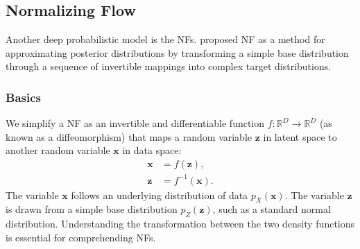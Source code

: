 \subsection{Normalizing Flow}
Another deep probabilistic model is the \acfp{NF}. \citeauthor{rezende2016} \citeyearpar{rezende2016} proposed \ac{NF} as a method for approximating posterior distributions by transforming a simple base distribution through a sequence of invertible mappings into complex target distributions. 

\subsubsection{Basics}
We simplify a \ac{NF} as an invertible and differentiable function $f:\mathbb{R}^D\rightarrow\mathbb{R}^D$ (as known as a diffeomorphism) that maps a random variable $\boldsymbol{z}$ in latent space to another random variable $\boldsymbol{x}$ in data space:
\begin{subequations}
    \begin{align}
        \label{eq:xfz}
        \boldsymbol{x} &= f(\boldsymbol{z}),\\
        \label{eq:zfx}
        \boldsymbol{z} &= f^{-1}(\boldsymbol{x}).
    \end{align}
\end{subequations}
The variable $\boldsymbol{x}$ follows an underlying distribution of data $p_X(\boldsymbol{x})$. The variable $\boldsymbol{z}$ is drawn from a simple base distribution $p_Z(\boldsymbol{z})$, such as a standard normal distribution. Understanding the transformation between the two density functions is essential for comprehending \acp{NF}. 
